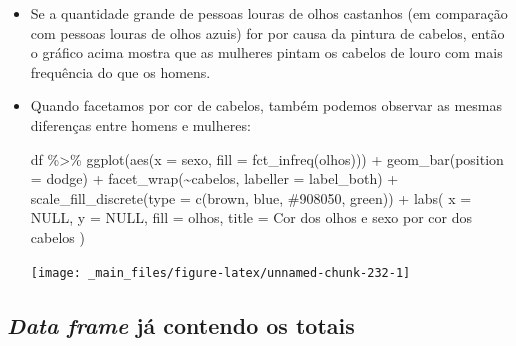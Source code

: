 \documentclass[
  11pt]{report}
\newenvironment{Shaded}{\begin{snugshade}}{\end{snugshade}}
\newcommand{\AttributeTok}[1]{\textcolor[rgb]{0.77,0.63,0.00}{#1}}
\newcommand{\ConstantTok}[1]{\textcolor[rgb]{0.00,0.00,0.00}{#1}}
\newcommand{\FunctionTok}[1]{\textcolor[rgb]{0.00,0.00,0.00}{#1}}
\newcommand{\NormalTok}[1]{#1}
\newcommand{\SpecialCharTok}[1]{\textcolor[rgb]{0.00,0.00,0.00}{#1}}
\newcommand{\StringTok}[1]{\textcolor[rgb]{0.31,0.60,0.02}{#1}}
\renewenvironment{Shaded}{
    \begin{mdframed}[%
      roundcorner=2pt,%
      innerleftmargin=5pt,%
      innerrightmargin=5pt,%
      topline=true,%
      leftline=true,%
      rightline=true,%
      bottomline=true,%
      linewidth=0.5pt,%
      linecolor=black!20,%
      backgroundcolor=black!2,%
      skipabove=2ex,%
      skipbelow=2.5ex%
    ]%
  }
  {
    \end{mdframed}
  }
\begin{document}
\begin{itemize}
\item
  Se a quantidade grande de pessoas louras de olhos castanhos (em comparação com pessoas louras de olhos azuis) for por causa da pintura de cabelos, então o gráfico acima mostra que as mulheres pintam os cabelos de louro com mais frequência do que os homens.
\item
  Quando facetamos por cor de cabelos, também podemos observar as mesmas diferenças entre homens e mulheres:

\begin{Shaded}
\begin{Highlighting}[]
\NormalTok{df }\SpecialCharTok{\%\textgreater{}\%} 
  \FunctionTok{ggplot}\NormalTok{(}\FunctionTok{aes}\NormalTok{(}\AttributeTok{x =}\NormalTok{ sexo, }\AttributeTok{fill =} \FunctionTok{fct\_infreq}\NormalTok{(olhos))) }\SpecialCharTok{+}
    \FunctionTok{geom\_bar}\NormalTok{(}\AttributeTok{position =} \StringTok{\textquotesingle{}dodge\textquotesingle{}}\NormalTok{) }\SpecialCharTok{+}
    \FunctionTok{facet\_wrap}\NormalTok{(}\SpecialCharTok{\textasciitilde{}}\NormalTok{cabelos, }\AttributeTok{labeller =}\NormalTok{ label\_both) }\SpecialCharTok{+}
    \FunctionTok{scale\_fill\_discrete}\NormalTok{(}\AttributeTok{type =} \FunctionTok{c}\NormalTok{(}\StringTok{\textquotesingle{}brown\textquotesingle{}}\NormalTok{, }\StringTok{\textquotesingle{}blue\textquotesingle{}}\NormalTok{, }\StringTok{\textquotesingle{}\#908050\textquotesingle{}}\NormalTok{, }\StringTok{\textquotesingle{}green\textquotesingle{}}\NormalTok{)) }\SpecialCharTok{+}
    \FunctionTok{labs}\NormalTok{(}
      \AttributeTok{x =} \ConstantTok{NULL}\NormalTok{,}
      \AttributeTok{y =} \ConstantTok{NULL}\NormalTok{,}
      \AttributeTok{fill =} \StringTok{\textquotesingle{}olhos\textquotesingle{}}\NormalTok{,}
      \AttributeTok{title =} \StringTok{\textquotesingle{}Cor dos olhos e sexo por cor dos cabelos\textquotesingle{}}
\NormalTok{    )}
\end{Highlighting}
\end{Shaded}

  \begin{center}\texttt{[image: \_main\_files/figure-latex/unnamed-chunk-232-1]} \end{center}
\end{itemize}

\hypertarget{data-frame-juxe1-contendo-os-totais}{%
\subsection{\texorpdfstring{\emph{Data frame} já contendo os totais}{Data frame já contendo os totais}}\label{data-frame-juxe1-contendo-os-totais}}
\end{document}

